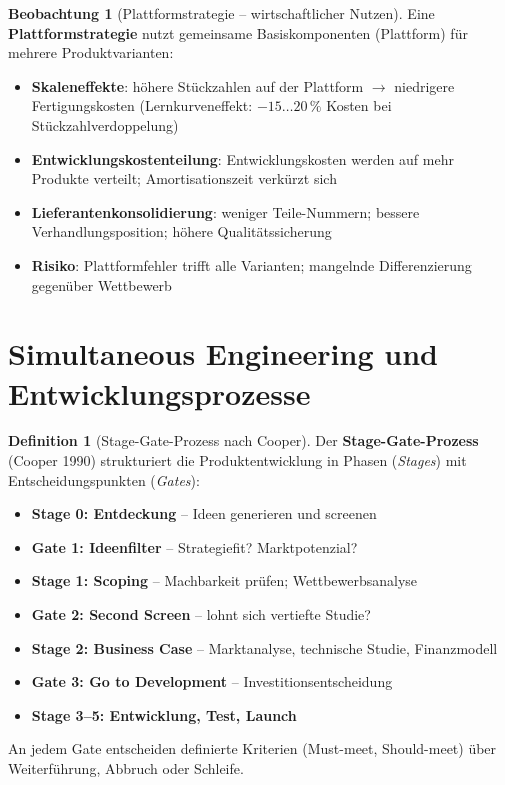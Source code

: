 ﻿\documentclass[a4paper,12pt]{report}
\theoremstyle{definition}
\newtheorem{definition}{Definition}
\newtheorem{beobachtung}{Beobachtung}
\begin{document}
\begin{beobachtung}[Plattformstrategie -- wirtschaftlicher Nutzen]
Eine \textbf{Plattformstrategie} nutzt gemeinsame Basiskomponenten
(Plattform) für mehrere Produktvarianten:
\begin{itemize}
    \item[-] \textbf{Skaleneffekte}: höhere Stückzahlen auf der Plattform
          $\to$ niedrigere Fertigungskosten (Lernkurveneffekt:
          $-15\ldots20\,\%$ Kosten bei Stückzahlverdoppelung)
    \item[-] \textbf{Entwicklungskostenteilung}: Entwicklungskosten werden
          auf mehr Produkte verteilt; Amortisationszeit verkürzt sich
    \item[-] \textbf{Lieferantenkonsolidierung}: weniger Teile-Nummern;
          bessere Verhandlungsposition; höhere Qualitätssicherung
    \item[-] \textbf{Risiko}: Plattformfehler trifft alle Varianten;
          mangelnde Differenzierung gegenüber Wettbewerb
\end{itemize}
\end{beobachtung}

\section{Simultaneous Engineering und Entwicklungsprozesse}

\begin{definition}[Stage-Gate-Prozess nach Cooper]
Der \textbf{Stage-Gate-Prozess} (Cooper 1990) strukturiert die Produktentwicklung
in Phasen (\emph{Stages}) mit Entscheidungspunkten (\emph{Gates}):
\begin{itemize}
    \item[-] \textbf{Stage 0: Entdeckung} -- Ideen generieren und screenen
    \item[-] \textbf{Gate 1: Ideenfilter} -- Strategiefit? Marktpotenzial?
    \item[-] \textbf{Stage 1: Scoping} -- Machbarkeit prüfen; Wettbewerbsanalyse
    \item[-] \textbf{Gate 2: Second Screen} -- lohnt sich vertiefte Studie?
    \item[-] \textbf{Stage 2: Business Case} -- Marktanalyse, technische Studie, Finanzmodell
    \item[-] \textbf{Gate 3: Go to Development} -- Investitionsentscheidung
    \item[-] \textbf{Stage 3--5: Entwicklung, Test, Launch}
\end{itemize}
An jedem Gate entscheiden definierte Kriterien (Must-meet, Should-meet)
über Weiterführung, Abbruch oder Schleife.
\end{definition}
\end{document}
